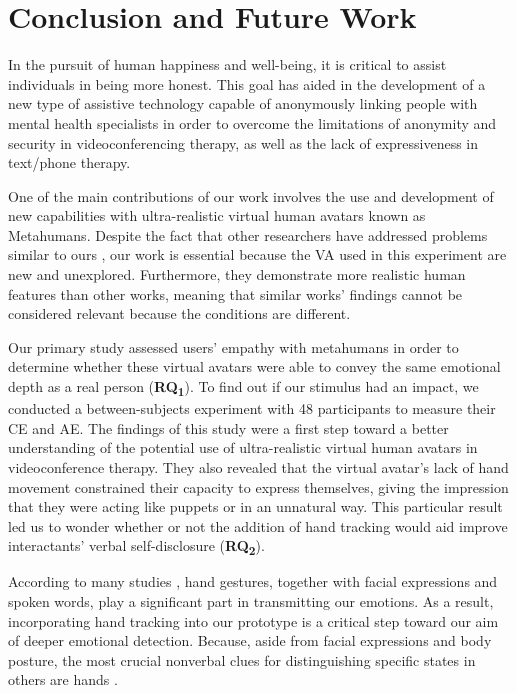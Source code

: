 \section{Conclusion and Future Work}
In the pursuit of human happiness and well-being, it is critical to assist individuals in being more honest. This goal has aided in the development of a new type of assistive technology capable of anonymously linking people with mental health specialists in order to overcome the limitations of anonymity and security in videoconferencing therapy, as well as the lack of expressiveness in text/phone therapy. 

One of the main contributions of our work involves the use and development of new capabilities with ultra-realistic virtual human avatars known as Metahumans. Despite the fact that other researchers have addressed problems similar to ours \cite{LU21, ZAL18, GRA07, LUC14, ROT19, KAN16, KAN10A, BAC19}, our work is essential because the VA used in this experiment are new and unexplored. Furthermore, they demonstrate more realistic human features than other works, meaning that similar works' findings cannot be considered relevant because the conditions are different.

Our primary study assessed users' empathy with metahumans in order to determine whether these virtual avatars were able to convey the same emotional depth as a real person (\textbf{RQ\textsubscript{1}}). To find out if our stimulus had an impact, we conducted a between-subjects experiment with 48 participants to measure their CE and AE. The findings of this study were a first step toward a better understanding of the potential use of ultra-realistic virtual human avatars in videoconference therapy. They also revealed that the virtual avatar's lack of hand movement constrained their capacity to express themselves, giving the impression that they were acting like puppets or in an unnatural way. This particular result led us to wonder whether or not the addition of hand tracking would aid improve interactants' verbal self-disclosure (\textbf{RQ\textsubscript{2}}).

According to many studies \cite{ARJ20, WAX97, REI22}, hand gestures, together with facial expressions and spoken words, play a significant part in transmitting our emotions. As a result, incorporating hand tracking into our prototype is a critical step toward our aim of deeper emotional detection. Because, aside from facial expressions and body posture, the most crucial nonverbal clues for distinguishing specific states in others are hands \cite{WAX97, REI22}.

